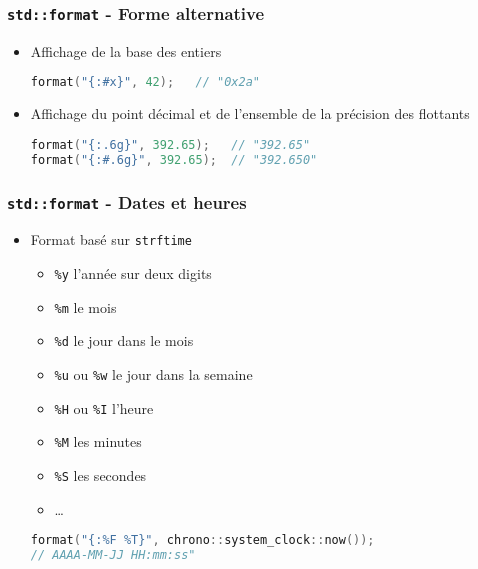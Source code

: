 \documentclass[C++.tex]{subfiles}
\begin{document}
\begin{frame}[fragile]
	\frametitle{\lstinline|std::format| - Forme alternative}
	\begin{itemize}
		\item Affichage de la base des entiers

		\begin{lstlisting}[language=C++]
format("{:#x}", 42);   // "0x2a"\end{lstlisting}

		\item Affichage du point décimal et de l'ensemble de la précision des flottants
		\begin{lstlisting}[language=C++]
format("{:.6g}", 392.65);   // "392.65"
format("{:#.6g}", 392.65);  // "392.650"\end{lstlisting}

	\end{itemize}
\end{frame}

\begin{frame}[fragile]
	\frametitle{\lstinline|std::format| - Dates et heures}
	\begin{itemize}
		\item Format basé sur \lstinline|strftime|
		\begin{itemize}
			\item \lstinline|%y| l'année sur deux digits
			\item \lstinline|%m| le mois
			\item \lstinline|%d| le jour dans le mois
			\item \lstinline|%u| ou \lstinline|%w| le jour dans la semaine


			\item \lstinline|%H| ou \lstinline|%I| l'heure

			
			\item \lstinline|%M| les minutes
			\item \lstinline|%S| les secondes
			\item \ldots
		\end{itemize}

		\begin{lstlisting}[language=C++]
format("{:%F %T}", chrono::system_clock::now());
// AAAA-MM-JJ HH:mm:ss"\end{lstlisting}
	\end{itemize}
\end{frame}
\end{document}
